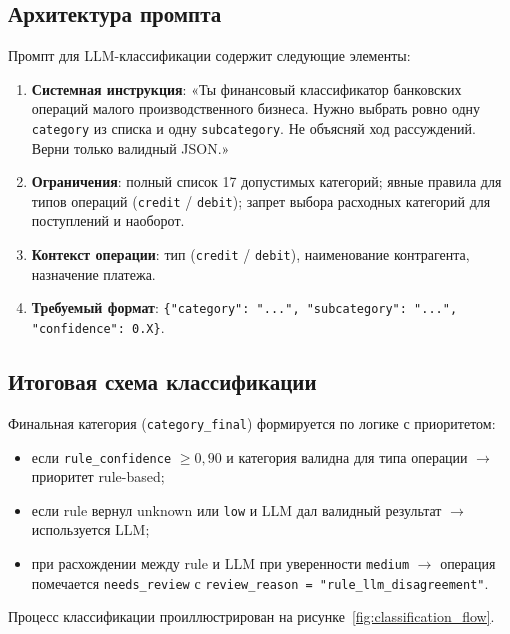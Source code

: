 \subsection{Архитектура промпта}

Промпт для LLM-классификации содержит следующие элементы:

\begin{enumerate}
  \item \textbf{Системная инструкция}: «Ты финансовый классификатор банковских операций малого производственного бизнеса. Нужно выбрать ровно одну \texttt{category} из списка и одну \texttt{subcategory}. Не объясняй ход рассуждений. Верни только валидный JSON.»
  \item \textbf{Ограничения}: полный список 17 допустимых категорий; явные правила для типов операций (\texttt{credit} / \texttt{debit}); запрет выбора расходных категорий для поступлений и наоборот.
  \item \textbf{Контекст операции}: тип (\texttt{credit} / \texttt{debit}), наименование контрагента, назначение платежа.
  \item \textbf{Требуемый формат}: \texttt{\{"category": "...", "subcategory": "...", "confidence": 0.X\}}.
\end{enumerate}

\subsection{Итоговая схема классификации}

Финальная категория (\texttt{category\_final}) формируется по логике с приоритетом:
\begin{itemize}
  \item если \texttt{rule\_confidence} $\geq 0{,}90$ и категория валидна для типа операции $\to$ приоритет rule-based;
  \item если rule вернул unknown или \texttt{low} и LLM дал валидный результат $\to$ используется LLM;
  \item при расхождении между rule и LLM при уверенности \texttt{medium} $\to$ операция помечается \texttt{needs\_review} с \texttt{review\_reason = "rule\_llm\_disagreement"}.
\end{itemize}

Процесс классификации проиллюстрирован на рисунке~\ref{fig:classification_flow}.

